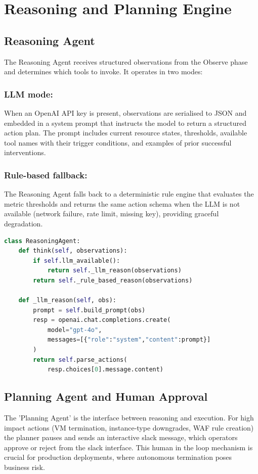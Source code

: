 \documentclass{ieeeaccess}
\begin{document}
\section{Reasoning and Planning Engine}
\label{sec:reasoning}

\subsection{Reasoning Agent}

The Reasoning Agent receives structured
observations from the Observe phase and determines which tools to invoke.
It operates in two modes:

\subsubsection{LLM mode:} When an OpenAI API key is present, observations are
serialised to JSON and embedded in a system prompt that instructs the model
to return a structured action plan. The prompt includes current resource
states, thresholds, available tool names with
their trigger conditions, and examples of prior successful interventions.

\subsubsection{Rule-based fallback:}
The Reasoning Agent falls back to a deterministic rule engine that evaluates the metric thresholds and returns the same action schema when the LLM is not available (network failure, rate limit, missing key), providing graceful degradation.
\begin{lstlisting}[language=Python,
  caption={Dual-mode dispatch in the Reasoning Agent}]
class ReasoningAgent:
    def think(self, observations):
        if self.llm_available():
            return self._llm_reason(observations)
        return self._rule_based_reason(observations)

    def _llm_reason(self, obs):
        prompt = self.build_prompt(obs)
        resp = openai.chat.completions.create(
            model="gpt-4o",
            messages=[{"role":"system","content":prompt}]
        )
        return self.parse_actions(
            resp.choices[0].message.content)
\end{lstlisting}

\subsection{Planning Agent and Human Approval}
The 'Planning Agent' is the interface between reasoning and execution. For high impact actions (VM termination, instance-type downgrades, WAF rule creation) the planner pauses and sends an interactive slack message, which operators approve or reject from the slack interface. This human in the loop mechanism is crucial for production deployments, where autonomous termination poses business risk.
\end{document}
